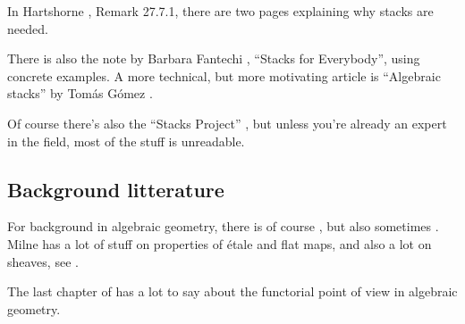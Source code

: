 \documentclass[11pt, english]{article}
\begin{document}
In Hartshorne \cite{hartshorne_def}, Remark 27.7.1, there are two pages explaining why stacks are needed.

There is also the note by Barbara Fantechi \cite{fantechi_stacks}, ``Stacks for Everybody'', using concrete examples. A more technical, but more motivating article is ``Algebraic stacks'' by Tomás Gómez \cite{gomez_stacks}.

Of course there's also the ``Stacks Project'' \cite{stacks-project}, but unless you're already an expert in the field, most of the stuff is unreadable. 

\subsection{Background litterature}

For background in algebraic geometry, there is of course \cite{hartshorne}, but also sometimes \cite{hartshorne_def}. Milne has a lot of stuff on properties of étale and flat maps, and also a lot on sheaves, see \cite{milne_etale}. 

The last chapter of \cite{eisenbud_harris} has a lot to say about the functorial point of view in algebraic geometry. 


 
\end{document}
